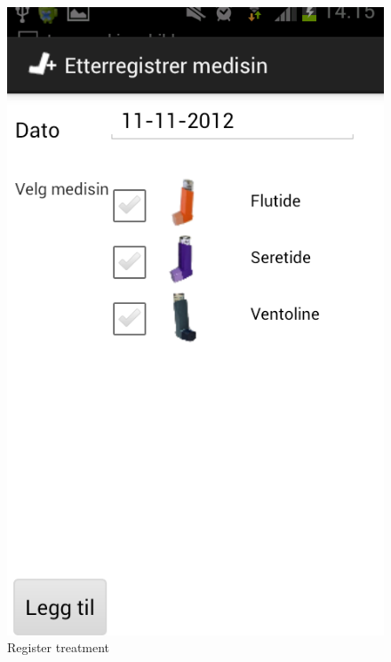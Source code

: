 \begin{figure}[H]
	\begin{minipage}[b]{0.3\linewidth}
		\centering
		\includegraphics[width=0.20\paperwidth]{Pictures/app-screenshots/register_treatment_old.png}
		\caption{Register treatment}
		\label{fig:gapp-register-treatment}
	\end{minipage}
	\hspace{0.5cm}
	\begin{minipage}[b]{0.3\linewidth}
		\centering

\end{minipage}
\end{figure}
